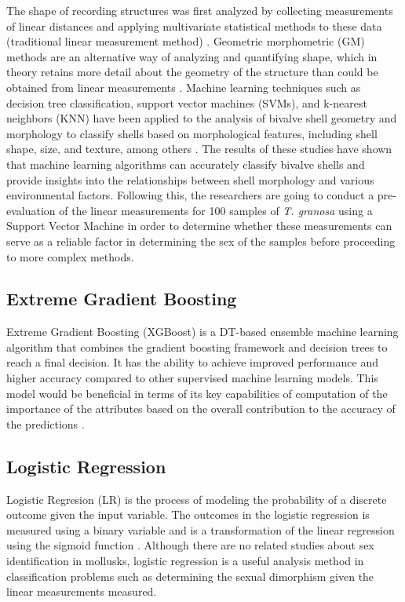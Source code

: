 The shape of recording structures was first analyzed by collecting measurements of linear distances and applying multivariate statistical methods to these data (traditional linear measurement method) \cite{rohlf1984}. Geometric morphometric (GM) methods are an alternative way of analyzing and quantifying shape, which in theory retains more detail about the geometry of the structure than could be obtained from linear measurements \cite{adams2004}. Machine learning techniques such as decision tree classification, support vector machines (SVMs), and k-nearest neighbors (KNN) have been applied to the analysis of bivalve shell geometry and morphology to classify shells based on morphological features, including shell shape, size, and texture, among others \cite{kiel2021}. The results of these studies have shown that machine learning algorithms can accurately classify bivalve shells and provide insights into the relationships between shell morphology and various environmental factors.
Following this, the researchers are going to conduct a pre-evaluation of the linear measurements for 100 samples of \textit{T. granosa} using a Support Vector Machine in order to determine whether these measurements can serve as a reliable factor in determining the sex of the samples before proceeding to more complex methods. 

\subsection{Extreme Gradient Boosting}
Extreme Gradient Boosting (XGBoost) is a DT-based ensemble machine learning algorithm that combines the gradient boosting framework and decision trees to reach a final decision. It has the ability to achieve improved performance and higher accuracy compared to other supervised machine learning models. This model would be beneficial in terms of its key capabilities of computation of the importance of the attributes based on the overall contribution to the accuracy of the predictions \cite{torres2023}. 

\subsection{Logistic Regression}

Logistic Regresion (LR) is the process of modeling the probability of a discrete outcome given the input variable. The outcomes in the logistic regression is measured using a binary variable and is a transformation of the linear regression using the sigmoid function \cite{cui2020}. Although there are no related studies about sex identification in mollusks, logistic regression is a useful analysis method in classification problems such as determining the sexual dimorphism given the linear measurements measured. 


